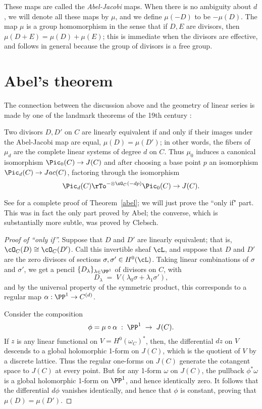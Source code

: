 These maps are called the \emph{Abel-Jacobi} maps. When there is no ambiguity about $d$, we will denote all these maps  by $\mu$,  and  
we define $\mu(-D)$ to be $-\mu(D)$. 
The map $\mu$ is a group homomorphism in the sense that if $D, E$ are divisors, then
$\mu (D+E) = \mu(D) + \mu(E)$; this is immediate when the divisors are effective, and 
follows in general because the group of divisors is a free group.

\section{Abel's theorem}
 The connection between the discussion above and the geometry of linear series is made by one of the landmark theorems of the 19th century :

\begin{theorem}\label{abel}
Two divisors $D, D'$ on $C$ are linearly equivalent if and only if their images under the Abel-Jacobi map are equal, $\mu(D) = \mu(D')$; in other words, the fibers of $\mu_d$ are the complete linear systems of degree $d$ on $C$. Thus $\mu_0$ induces a canonical isomorphism
$\Pic_0(C) \to J(C)$ and after choosing a base point $p$ an isomorphism $\Pic_d(C) \to Jac(C)$, factoring through the isomorphism
$$
\Pic_d(C) \rTo^{-\otimes \sO_C(-dp)} \Pic_0(C) \to J(C).
$$
\end{theorem}


See \cite[Section 2.2]{Griffiths-Harris1978}  for a complete proof of Theorem~\ref{abel}; we will just prove the ``only if" part. This was in fact the only part proved by Abel; the converse, which is substantially more subtle, was proved by Clebsch.

\begin{proof}[Proof of ``only if'']
Suppose that $D$ and $D'$ are linearly equivalent; that is, $\cO_C(D) \cong \cO_C(D')$. Call this invertible sheaf $\cL$, and suppose that $D$ and $D'$ are the zero divisors of sections $\sigma, \sigma' \in H^0(\cL)$.
Taking linear combinations of $\sigma$ and $\sigma'$, we get a pencil $\{D_\lambda\}_{\lambda \in \PP^1}$ of divisors on $C$, with
$$
D_\lambda \; = \; V(\lambda_0\sigma + \lambda_1\sigma'),
$$
and by the universal property of the symmetric product, this corresponds to a regular map $\alpha : \PP^1 \to C^{(d)}$. 

Consider the composition
$$
\phi = \mu \circ \alpha \; : \; \PP^1 \; \to \; J(C).
$$
 If $z$ is any linear functional on $V = H^0(\omega_C)^*$, then, the differential $dz$  on $V$ descends to a global holomorphic 1-form on
 $J(C)$, which is the quotient of $V$ by a discrete lattice. Thus the regular one-forms on $J(C)$ generate the cotangent space to $J(C)$ at every point. But for any 1-form $\omega$ on $J(C)$, the pullback $\phi^*\omega$ is a global holomorphic 1-form on $\PP^1$, and hence identically zero. It follows that the differential $d\phi$ vanishes identically, and hence that $\phi$ is constant, proving that $\mu(D) = \mu(D')$.
\end{proof}

